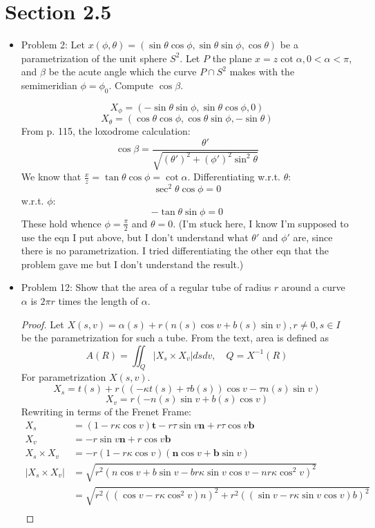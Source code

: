 \documentclass[a4paper,17pt]{extarticle}
\title{\scalebox{2}{Math 553 Homework 6}}
\author{\scalebox{1.5}{Theo Koss}}
\date{May 2022}
\theoremstyle{definition}
\renewcommand{\skip}{\par\null\par}
\begin{document}
\maketitle
\section{Section 2.5}
\begin{itemize}
    \item Problem 2: Let $x(\phi,\theta)=(\sin\theta\cos\phi,\sin\theta\sin\phi,\cos\theta)$ be a parametrization of the unit sphere $S^2$. Let $P$ the plane $x=z\cot\alpha,0<\alpha<\pi$, and $\beta$ be the acute angle which the curve $P\cap S^2$ makes with the semimeridian $\phi=\phi_0$. Compute $\cos\beta$.\skip $$X_{\phi}=(-\sin\theta\sin\phi,\sin\theta\cos\phi,0)$$ $$X_{\theta}=(\cos\theta\cos\phi,\cos\theta\sin\phi,-\sin\theta)$$
    From p. 115, the loxodrome calculation: $$\cos\beta=\frac{\theta'}{\sqrt{(\theta')^2+(\phi')^2\sin^2\theta}}$$ We know that $\frac{x}{z}=\tan\theta\cos\phi=\cot\alpha$. Differentiating w.r.t. $\theta$: $$\sec^2\theta\cos\phi=0$$ w.r.t. $\phi$: $$-\tan\theta\sin\phi=0$$ These hold whence $\phi=\frac{\pi}{2}$ and $\theta=0$. (I'm stuck here, I know I'm supposed to use the eqn I put above, but I don't understand what $\theta'$ and $\phi'$ are, since there is no parametrization. I tried differentiating the other eqn that the problem gave me but I don't understand the result.)
    \item Problem 12: Show that the area of a regular tube of radius $r$ around a curve $\alpha$ is $2\pi r$ times the length of $\alpha$.\begin{proof}Let $X(s,v)=\alpha(s)+r(n(s)\cos v+b(s)\sin v), r\neq0,s\in I$ be the parametrization for such a tube. From the text, area is defined as $$A(R)=\iint_Q|X_s\times X_v|dsdv,\quad Q=X^{-1}(R)$$ For parametrization $X(s,v)$. $$X_s=t(s)+r((-\kappa t(s)+\tau b(s))\cos v-\tau n(s)\sin v)$$ $$X_v=r(-n(s)\sin v+b(s)\cos v)$$ Rewriting in terms of the Frenet Frame:\begin{align*}
         X_s&=(1-r\kappa\cos v)\mathbf{t}-r\tau\sin v\mathbf{n}+r\tau\cos v\mathbf{b}\\ 
         X_v&=-r\sin v\mathbf{n}+r\cos v\mathbf{b}\\
         X_s\times X_v&=-r(1-r\kappa\cos v)(\mathbf{n}\cos v+\mathbf{b}\sin v)\\
        |X_s\times X_v|&=\sqrt{r^2(n\cos v+b\sin v-br\kappa\sin v\cos v-nr\kappa\cos^2v)^2}\\
        &=\sqrt{r^2((\cos v-r\kappa\cos^2v)n)^2+r^2((\sin v-r\kappa\sin v\cos v)b)^2}\\

\end{align*}
\end{proof}
\end{itemize}
\end{document}
